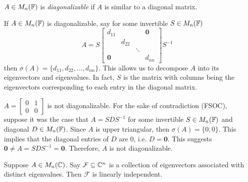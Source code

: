 \begin{definition}[Diagonalizable]
\label{def:diagonalizable}
$A \in M_n(\mathbb F)$ is \textit{diagonalizable} if $A$ is similar to a diagonal matrix.
\end{definition}

\begin{note*}
If $A \in M_n(\mathbb F)$ is diagonalizable, say for some invertible $S \in M_n(\mathbb F)$
$$
A = S\begin{bmatrix}
d_{11} & & & \textbf{0}\\
 & d_{22} & & \\
 & & \ddots & \\
\textbf{0}& & & d_{nn}
\end{bmatrix}S^{-1}
$$
then $\sigma(A) = \{d_{11}, d_{22}, \dots, d_{nn}\}$. This allows us to decompose $A$ into its eigenvectors and eigenvalues. In fact, $S$ is the matrix with columns being the eigenvectors corresponding to each entry in the diagonal matrix.
\end{note*}

\begin{example}
$A = \begin{bmatrix}0 & 1 \\ 0 & 0\end{bmatrix}$ is not diagonalizable. For the sake of contradiction (FSOC), suppose it was the case that $A = SDS^{-1}$ for some invertible $S \in M_n(\mathbb F)$ and diagonal $D \in M_n(\mathbb F)$. Since $A$ is upper triangular, then $\sigma(A) = \{0, 0\}$. This implies that the diagonal entries of $D$ are 0, i.e. $D = \mathbf{0}$. This suggests $\mathbf{0} \not= A = SDS^{-1} = \mathbf{0}$. Therefore, $A$ is not diagonalizable.
\end{example}

\begin{lemma}
\label{lem:evecs-lin-indep}
Suppose $A \in M_n(\mathbb C)$. Say $\mathcal{F} \subseteq \mathbb C^n$ is a collection of eigenvectors associated with distinct eigenvalues. Then $\mathcal{F}$ is linearly independent.
\end{lemma}

